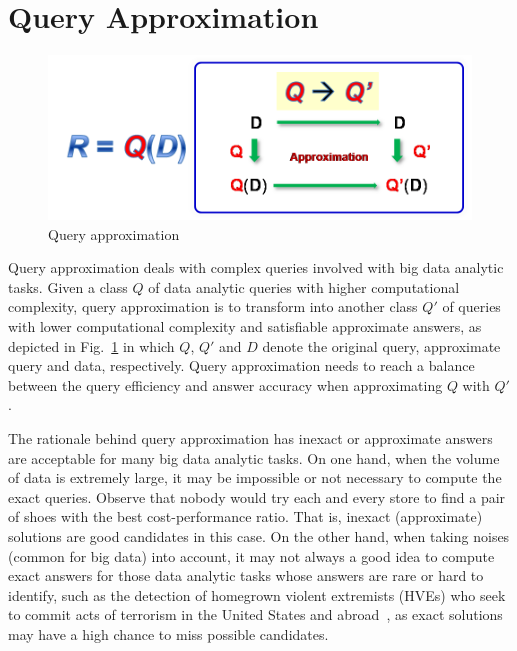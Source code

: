 \section{Query Approximation}
\label{sec-query}



\begin{figure}[tb!]
  \vspace{-1ex}
  \begin{center}
  \includegraphics[scale=0.45]{./queryApprox.png}
  \end{center}
  \vspace{-3ex}
  \caption{Query approximation}\label{fig-tech-queryappro}
  \vspace{-2ex}
\end{figure}


Query approximation deals with complex queries involved with big data analytic tasks. Given a class $Q$ of data analytic queries with higher computational complexity,  query approximation is to transform into another class $Q'$ of queries with lower computational complexity and satisfiable approximate answers, as depicted in Fig.~\ref{fig-tech-queryappro} in which $Q$, $Q'$ and $D$ denote the original query, approximate query and data, respectively. Query approximation needs to reach a balance between the query efficiency and answer accuracy when approximating $Q$ with $Q'$.

The rationale behind query approximation has inexact or approximate answers are acceptable for many big data analytic tasks.
On one hand, when the volume of data is extremely large, it may be impossible or not necessary to compute the exact queries.
Observe that nobody would try each and every store to find a pair of shoes with the best cost-performance ratio.
That is, inexact (approximate) solutions are good candidates in this case.
%
On the other hand, when taking noises (common for big data) into account, it may not always a good idea to compute exact answers
for those data analytic tasks whose answers are rare or hard to identify, such as the detection of homegrown violent extremists (HVEs) who seek to commit acts of terrorism in the United States and abroad~\cite{HungJ16}, as exact solutions may have a high chance to miss possible candidates.

